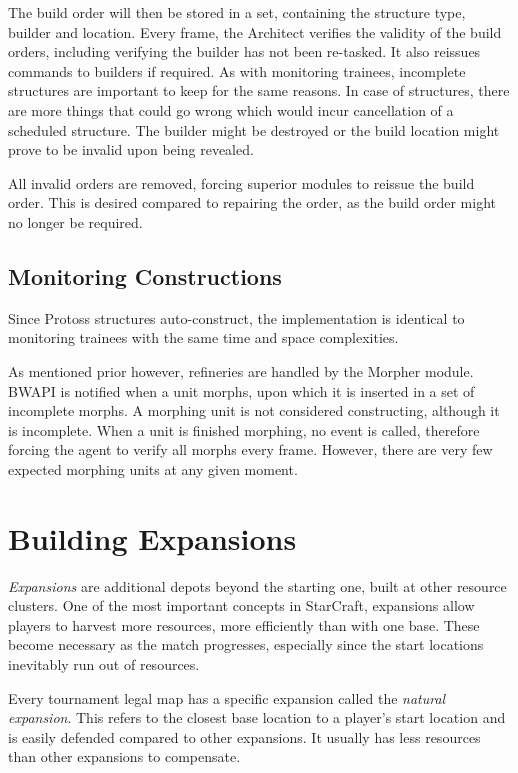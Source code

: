 	The build order will then be stored in a set, containing the structure type, builder and location. Every frame, the Architect verifies the validity of the build orders, including verifying the builder has not been re-tasked. It also reissues commands to builders if required. As with monitoring trainees, incomplete structures are important to keep for the same reasons. In case of structures, there are more things that could go wrong which would incur cancellation of a scheduled structure. The builder might be destroyed or the build location might prove to be invalid upon being revealed.
	
	All invalid orders are removed, forcing superior modules to reissue the build order. This is desired compared to repairing the order, as the build order might no longer be required.
	
	\subsection*{Monitoring Constructions}
	Since Protoss structures auto-construct, the implementation is identical to monitoring trainees with the same time and space complexities.
	
	As mentioned prior however, refineries are handled by the Morpher module. BWAPI is notified when a unit morphs, upon which it is inserted in a set of incomplete morphs. A morphing unit is not considered constructing, although it is incomplete. When a unit is finished morphing, no event is called, therefore forcing the agent to verify all morphs every frame. However, there are very few expected morphing units at any given moment.

\section{Building Expansions}
\emph{Expansions} are additional depots beyond the starting one, built at other resource clusters. One of the most important concepts in StarCraft, expansions allow players to harvest more resources, more efficiently than with one base. These become necessary as the match progresses, especially since the start locations inevitably run out of resources.

Every tournament legal map has a specific expansion called the \emph{natural expansion}. This refers to the closest base location to a player's start location and is easily defended compared to other expansions. It usually has less resources than other expansions to compensate. %

